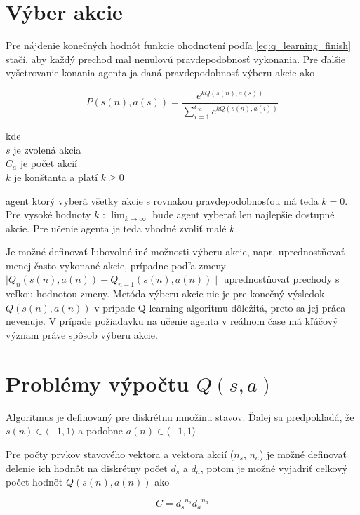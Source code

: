 \section{Výber akcie}

Pre nájdenie konečných hodnôt funkcie ohodnotení podľa \ref{eq:q_learning_finish}
stačí, aby každý prechod mal nenulovú pravdepodobnosť vykonania. Pre ďalšie vyšetrovanie
konania agenta ja daná pravdepodobnosť výberu akcie  ako

\begin{equation}
P(s(n), a(s)) = \frac{e^{kQ(s(n), a(s))}}{ \sum\limits_{i=1}^{C_a}{e^{kQ(s(n), a(i))}} }
\label{eq:action_selection}
\end{equation}

kde \\
$s$ je zvolená akcia \\
$C_a$ je počet akcií \\
$k$ je konštanta a platí $k \geq 0$

agent ktorý vyberá všetky akcie s rovnakou pravdepodobnosťou má teda $k = 0$.
Pre vysoké hodnoty $k$ : $\lim_{k\to\infty}$ bude agent vyberať len najlepšie
dostupné akcie. Pre učenie agenta je teda vhodné zvoliť malé $k$.

Je možné definovať ľubovolné iné možnosti výberu akcie, napr. uprednostňovať menej
často vykonané akcie, prípadne podľa zmeny
$\mid Q_{n}(s(n), a(n)) - Q_{n-1}(s(n), a(n)) \mid$ uprednostňovať prechody s veľkou hodnotou zmeny.
Metóda výberu akcie nie je pre konečný výsledok $Q(s(n),a(n))$ v prípade Q-learning
algoritmu dôležitá, preto sa jej práca nevenuje. V prípade požiadavku na učenie
agenta v reálnom čase má kľúčový význam práve spôsob výberu akcie.

\section{Problémy výpočtu $Q(s, a)$}

Algoritmus je definovaný pre diskrétnu množinu stavov. Ďalej sa predpokladá, že
$s(n) \in \langle -1, 1 \rangle$ a podobne $a(n) \in \langle -1, 1 \rangle$

 Pre počty prvkov
stavového vektora a vektora akcií ($n_s$, $n_a$) je možné definovať
delenie ich hodnôt na diskrétny počet $d_s$ a $d_a$, potom je možné vyjadriť celkový počet
hodnôt $Q(s(n), a(n))$ ako

\begin{equation}
C = {d_s}^{n_s} {d_a}^{n_a}
\label{eq:q_size}
\end{equation}

